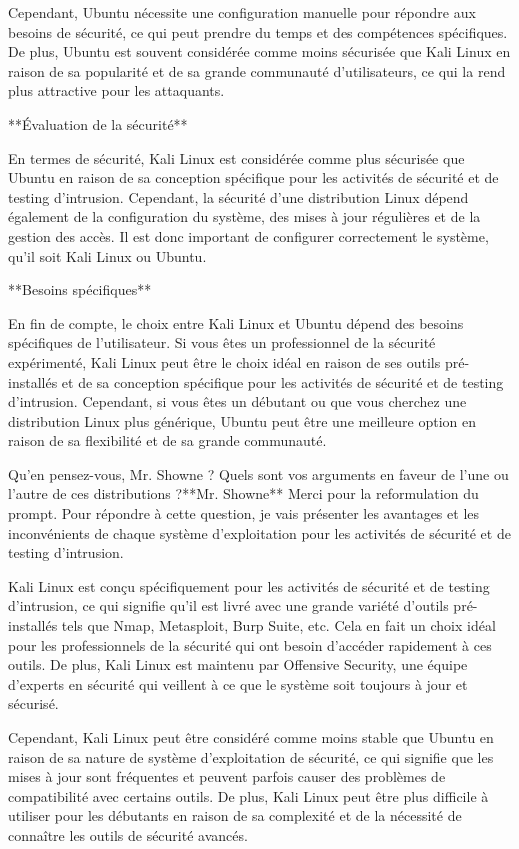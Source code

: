Cependant, Ubuntu nécessite une configuration manuelle pour répondre aux besoins de sécurité, ce qui peut prendre du temps et des compétences spécifiques. De plus, Ubuntu est souvent considérée comme moins sécurisée que Kali Linux en raison de sa popularité et de sa grande communauté d'utilisateurs, ce qui la rend plus attractive pour les attaquants.

**Évaluation de la sécurité**

En termes de sécurité, Kali Linux est considérée comme plus sécurisée que Ubuntu en raison de sa conception spécifique pour les activités de sécurité et de testing d'intrusion. Cependant, la sécurité d'une distribution Linux dépend également de la configuration du système, des mises à jour régulières et de la gestion des accès. Il est donc important de configurer correctement le système, qu'il soit Kali Linux ou Ubuntu.

**Besoins spécifiques**

En fin de compte, le choix entre Kali Linux et Ubuntu dépend des besoins spécifiques de l'utilisateur. Si vous êtes un professionnel de la sécurité expérimenté, Kali Linux peut être le choix idéal en raison de ses outils pré-installés et de sa conception spécifique pour les activités de sécurité et de testing d'intrusion. Cependant, si vous êtes un débutant ou que vous cherchez une distribution Linux plus générique, Ubuntu peut être une meilleure option en raison de sa flexibilité et de sa grande communauté.

Qu'en pensez-vous, Mr. Showne ? Quels sont vos arguments en faveur de l'une ou l'autre de ces distributions ?**Mr. Showne**
Merci pour la reformulation du prompt. Pour répondre à cette question, je vais présenter les avantages et les inconvénients de chaque système d'exploitation pour les activités de sécurité et de testing d'intrusion.

Kali Linux est conçu spécifiquement pour les activités de sécurité et de testing d'intrusion, ce qui signifie qu'il est livré avec une grande variété d'outils pré-installés tels que Nmap, Metasploit, Burp Suite, etc. Cela en fait un choix idéal pour les professionnels de la sécurité qui ont besoin d'accéder rapidement à ces outils. De plus, Kali Linux est maintenu par Offensive Security, une équipe d'experts en sécurité qui veillent à ce que le système soit toujours à jour et sécurisé.

Cependant, Kali Linux peut être considéré comme moins stable que Ubuntu en raison de sa nature de système d'exploitation de sécurité, ce qui signifie que les mises à jour sont fréquentes et peuvent parfois causer des problèmes de compatibilité avec certains outils. De plus, Kali Linux peut être plus difficile à utiliser pour les débutants en raison de sa complexité et de la nécessité de connaître les outils de sécurité avancés.

